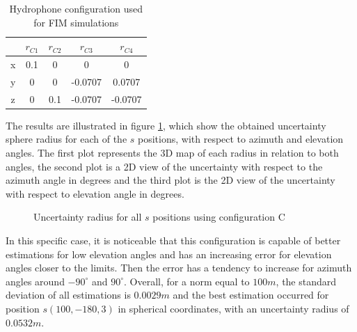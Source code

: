 \begin{table}[!htbp] %
	\begin{center}
		\begin{tabular}{ c | c c c c}
			\toprule
			\multicolumn{1}{c|}{} &$r_{C1}$& $r_{C2}$ & $r_{C3}$ & $r_{C4}$ \\
			\midrule
			\multirow{1}{0.5em}{x} & 0.1 & 0 & 0 & 0  \\
			\multirow{1}{0.5em}{y} & 0 & 0 & -0.0707 & 0.0707 \\
			\multirow{1}{0.5em}{z} & 0 & 0.1 & -0.0707  & -0.0707\\
			\bottomrule 
		\end{tabular}
		\caption{Hydrophone configuration used for FIM simulations}
		\label{tab:config-fim}
	\end{center}
\end{table}

The results are illustrated in figure \ref{fig:fim-100-C}, which show the obtained uncertainty sphere radius for each of the $s$ positions, with respect to azimuth and elevation angles. The first plot represents the 3D map of each radius in relation to both angles, the second plot is a 2D view of the uncertainty with respect to the azimuth angle  in degrees and the third plot is the 2D view of the uncertainty with respect to elevation angle in degrees.

\begin{figure}[!htb]
	\captionsetup{justification=centering,margin=2cm}
	\caption{Uncertainty radius for all $s$ positions using configuration C}
	\label{fig:fim-100-C}
\end{figure}

In this specific case, it is noticeable that this configuration is capable of better estimations for low elevation angles and has an increasing error for elevation angles closer to the limits. Then the error has a tendency to increase for azimuth angles around $-90^{\circ}$ and $90^{\circ}$. Overall, for a norm equal to $100 m$, the standard deviation of all estimations is $0.0029m$ and the best estimation occurred for position $s(100,-180,3)$ in spherical coordinates, with an uncertainty radius of $0.0532m$.

